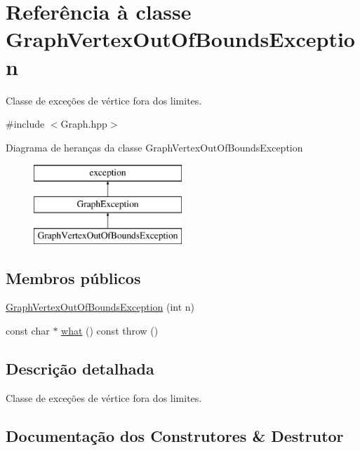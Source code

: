 \hypertarget{classGraphVertexOutOfBoundsException}{}\section{Referência à classe Graph\+Vertex\+Out\+Of\+Bounds\+Exception}
\label{classGraphVertexOutOfBoundsException}


Classe de exceções de vértice fora dos limites.  




{\ttfamily \#include $<$Graph.\+hpp$>$}

Diagrama de heranças da classe Graph\+Vertex\+Out\+Of\+Bounds\+Exception\begin{figure}[H]
\begin{center}
\leavevmode
\includegraphics[height=3.000000cm]{classGraphVertexOutOfBoundsException}
\end{center}
\end{figure}
\subsection*{Membros públicos}
\begin{DoxyCompactItemize}
\item 
\mbox{\hyperlink{classGraphVertexOutOfBoundsException_a6f72cde302ff14c75138a7d1043d43e0}{Graph\+Vertex\+Out\+Of\+Bounds\+Exception}} (int n)
\item 
const char $\ast$ \mbox{\hyperlink{classGraphVertexOutOfBoundsException_ac85fc95ea1c178023571adf7a9b8b0df}{what}} () const  throw ()
\end{DoxyCompactItemize}


\subsection{Descrição detalhada}
Classe de exceções de vértice fora dos limites. 

\subsection{Documentação dos Construtores \& Destrutor}
\mbox{\label{classGraphVertexOutOfBoundsException_a6f72cde302ff14c75138a7d1043d43e0}} 

